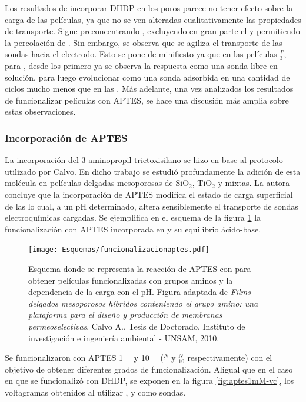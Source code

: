 		    Los resultados de incorporar DHDP en los poros parece no tener efecto sobre la carga de las películas, ya que no se ven alteradas cualitativamente las propiedades de transporte. Sigue preconcentrando \ru, excluyendo en gran parte el \fe\space y permitiendo la percolación de \fc. Sin embargo, se observa que se agiliza el transporte de las sondas hacia el electrodo. Esto se pone de minifiesto ya que en las películas \pdmZ$^P_3$, para \ru,  desde los primero ya se observa la respuesta como una sonda libre en solución, para luego evolucionar como una sonda adsorbida en una cantidad de ciclos mucho menos que en las \pdmZ. Más adelante, una vez analizados los resultados de funcionalizar películas con APTES, se hace una discusión más amplia sobre estas observaciones.
			
		\subsubsection{Incorporación de APTES}
			
			La incorporación del 3-aminopropil trietoxisilano se hizo en base al protocolo utilizado por Calvo\cite{Calvo20210}. En dicho trabajo se estudió profundamente la adición de esta molécula en películas delgadas mesoporosas de SiO$_2$, TiO$_2$ y mixtas. La autora concluye que la incorporación de APTES modifica el estado de carga superficial de las \pdm\space lo cual, a un pH determinado, altera sensiblemente el transporte de sondas electroquímicas cargadas. Se ejemplifica en el esquema de la figura \ref{esq:aptes-esquema} la funcionalización con APTES incorporada en \pdmZ\space y su equilibrio ácido-base.

				 \begin{figure}[b!]	
					\centering
			 	    \texttt{[image: Esquemas/funcionalizacionaptes.pdf]}
			        \caption[Funcionalización con APTES 1mM]{Esquema donde se representa la reacción de APTES con \pdmZ\space para obtener películas funcionalizadas con grupos aminos y la dependencia de la carga con el pH. Figura adaptada de \textit{Films delgados mesoporosos híbridos conteniendo el grupo amino: una plataforma para el diseño y producción de membranas permeoselectivas}, Calvo A., Tesis de Doctorado, Instituto de investigación e ingeniería ambiental - UNSAM, 2010.\cite{Calvo20210}}
			        \label{esq:aptes-esquema}
			      	\end{figure}

			\pagebreak Se funcionalizaron \pdmZ\space con APTES \SI{1}{\milli\Molar} y \SI{10}{\milli\Molar} (\pdmZ$^N_{1}$ y \pdmZ$^N_{10}$ respectivamente) con el objetivo de obtener diferentes grados de funcionalización\cite{Calvo20210,Angelome2008,Fuertes2010}. Al\space igual que en el caso en que se funcionalizó con DHDP, se exponen en la figura \ref{fig:aptes1mM-vc}, los voltagramas obtenidos al utilizar \fe, \fc\space y \ru\space como sondas.

